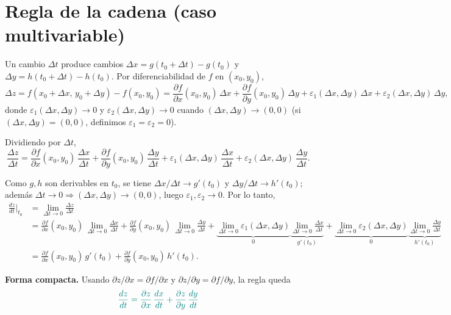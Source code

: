 \documentclass{article}
\begin{document}
\section*{Regla de la cadena (caso multivariable)}


Un cambio \(\Delta t\) produce cambios \(\Delta x=g(t_0+\Delta t)-g(t_0)\) y
\(\Delta y=h(t_0+\Delta t)-h(t_0)\). Por diferenciabilidad de \(f\) en \((x_0,y_0)\),
\[
\Delta z
= f(x_0+\Delta x,\,y_0+\Delta y)-f(x_0,y_0)
= \frac{\partial f}{\partial x}(x_0,y_0)\,\Delta x
+ \frac{\partial f}{\partial y}(x_0,y_0)\,\Delta y
+ \varepsilon_1(\Delta x,\Delta y)\,\Delta x
+ \varepsilon_2(\Delta x,\Delta y)\,\Delta y,
\]
donde \(\varepsilon_1(\Delta x,\Delta y)\to 0\) y \(\varepsilon_2(\Delta x,\Delta y)\to 0\) cuando
\((\Delta x,\Delta y)\to(0,0)\) (si \((\Delta x,\Delta y)=(0,0)\), definimos \(\varepsilon_1=\varepsilon_2=0\)).

Dividiendo por \(\Delta t\),
\[
\frac{\Delta z}{\Delta t}
= \frac{\partial f}{\partial x}(x_0,y_0)\,\frac{\Delta x}{\Delta t}
+ \frac{\partial f}{\partial y}(x_0,y_0)\,\frac{\Delta y}{\Delta t}
+ \varepsilon_1(\Delta x,\Delta y)\,\frac{\Delta x}{\Delta t}
+ \varepsilon_2(\Delta x,\Delta y)\,\frac{\Delta y}{\Delta t}.
\]

Como \(g,h\) son derivables en \(t_0\), se tiene \(\Delta x/\Delta t \to g'(t_0)\) y
\(\Delta y/\Delta t \to h'(t_0)\); además \(\Delta t\to0\Rightarrow (\Delta x,\Delta y)\to(0,0)\),
luego \(\varepsilon_1,\varepsilon_2\to 0\). Por lo tanto,
\[
\begin{aligned}
\frac{dz}{dt}\Big|_{t_0}
&= \lim_{\Delta t\to0}\frac{\Delta z}{\Delta t} \\
&= \frac{\partial f}{\partial x}(x_0,y_0)\,\lim_{\Delta t\to0}\frac{\Delta x}{\Delta t}
  + \frac{\partial f}{\partial y}(x_0,y_0)\,\lim_{\Delta t\to0}\frac{\Delta y}{\Delta t}
  + \underbrace{\lim_{\Delta t\to0}\varepsilon_1(\Delta x,\Delta y)}_{0}\!
    \underbrace{\lim_{\Delta t\to0}\frac{\Delta x}{\Delta t}}_{g'(t_0)}
  + \underbrace{\lim_{\Delta t\to0}\varepsilon_2(\Delta x,\Delta y)}_{0}\!
    \underbrace{\lim_{\Delta t\to0}\frac{\Delta y}{\Delta t}}_{h'(t_0)} \\
&= \frac{\partial f}{\partial x}(x_0,y_0)\,g'(t_0)
 +  \frac{\partial f}{\partial y}(x_0,y_0)\,h'(t_0).
\end{aligned}
\]

\textbf{Forma compacta.} Usando \(\partial z/\partial x=\partial f/\partial x\) y
\(\partial z/\partial y=\partial f/\partial y\), la regla queda
\[\color{teal}
{\;\frac{dz}{dt}
= \frac{\partial z}{\partial x}\,\frac{dx}{dt}
+ \frac{\partial z}{\partial y}\,\frac{dy}{dt}\;}
\]
\end{document}
